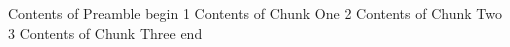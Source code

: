 Contents of Preamble
begin
1
Contents of Chunk One
2
Contents of Chunk Two
3
Contents of Chunk Three
end
